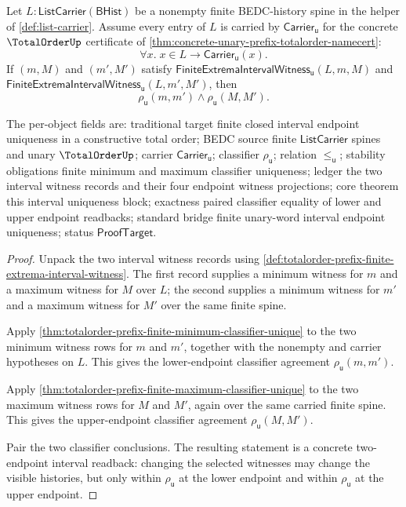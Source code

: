 \begin{theorem}
\label{thm:totalorder-prefix-finite-extrema-interval-unique}
Let $L:\mathsf{ListCarrier}(\mathsf{BHist})$ be a nonempty finite BEDC-history
spine in the helper of \autoref{def:list-carrier}. Assume every entry of $L$ is
carried by $\mathsf{Carrier}_{\mathsf{u}}$ for the concrete $\TotalOrderUp$
certificate of \autoref{thm:concrete-unary-prefix-totalorder-namecert}:
$$
\forall x.\; x\in L\to \mathsf{Carrier}_{\mathsf{u}}(x).
$$
If $(m,M)$ and $(m',M')$ satisfy
$\mathsf{FiniteExtremaIntervalWitness}_{\mathsf{u}}(L,m,M)$ and
$\mathsf{FiniteExtremaIntervalWitness}_{\mathsf{u}}(L,m',M')$, then
$$
\rho_{\mathsf{u}}(m,m')
\land
\rho_{\mathsf{u}}(M,M').
$$

The per-object fields are: traditional target finite closed interval endpoint
uniqueness in a constructive total order; BEDC source finite
$\mathsf{ListCarrier}$ spines and unary $\TotalOrderUp$; carrier
$\mathsf{Carrier}_{\mathsf{u}}$; classifier $\rho_{\mathsf{u}}$; relation
$\le_{\mathsf{u}}$; stability obligations finite minimum and maximum
classifier uniqueness; ledger the two interval witness records and their four
endpoint witness projections; core theorem this interval uniqueness block;
exactness paired classifier equality of lower and upper endpoint readbacks;
standard bridge finite unary-word interval endpoint uniqueness; status
$\mathsf{ProofTarget}$.
\end{theorem}
\begin{proof}
Unpack the two interval witness records using
\autoref{def:totalorder-prefix-finite-extrema-interval-witness}. The first
record supplies a minimum witness for $m$ and a maximum witness for $M$ over
$L$; the second supplies a minimum witness for $m'$ and a maximum witness for
$M'$ over the same finite spine.

Apply
\autoref{thm:totalorder-prefix-finite-minimum-classifier-unique} to the two
minimum witness rows for $m$ and $m'$, together with the nonempty and carrier
hypotheses on $L$. This gives the lower-endpoint classifier agreement
$\rho_{\mathsf{u}}(m,m')$.

Apply
\autoref{thm:totalorder-prefix-finite-maximum-classifier-unique} to the two
maximum witness rows for $M$ and $M'$, again over the same carried finite
spine. This gives the upper-endpoint classifier agreement
$\rho_{\mathsf{u}}(M,M')$.

Pair the two classifier conclusions. The resulting statement is a concrete
two-endpoint interval readback: changing the selected witnesses may change the
visible histories, but only within $\rho_{\mathsf{u}}$ at the lower endpoint
and within $\rho_{\mathsf{u}}$ at the upper endpoint.
\end{proof}

